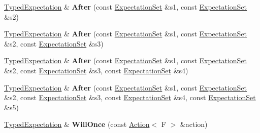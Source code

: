 \begin{DoxyCompactItemize}
\hyperlink{classtesting_1_1internal_1_1_typed_expectation}{Typed\+Expectation} \& {\bfseries After} (const \hyperlink{classtesting_1_1_expectation_set}{Expectation\+Set} \&s1, const \hyperlink{classtesting_1_1_expectation_set}{Expectation\+Set} \&s2)
\item 
\mbox{\label{classtesting_1_1internal_1_1_typed_expectation_a95a341dd221901b5e51dd7cfdbdb3570}} 
\hyperlink{classtesting_1_1internal_1_1_typed_expectation}{Typed\+Expectation} \& {\bfseries After} (const \hyperlink{classtesting_1_1_expectation_set}{Expectation\+Set} \&s1, const \hyperlink{classtesting_1_1_expectation_set}{Expectation\+Set} \&s2, const \hyperlink{classtesting_1_1_expectation_set}{Expectation\+Set} \&s3)
\item 
\mbox{\label{classtesting_1_1internal_1_1_typed_expectation_a1749e368f659352ed8375512acafc178}} 
\hyperlink{classtesting_1_1internal_1_1_typed_expectation}{Typed\+Expectation} \& {\bfseries After} (const \hyperlink{classtesting_1_1_expectation_set}{Expectation\+Set} \&s1, const \hyperlink{classtesting_1_1_expectation_set}{Expectation\+Set} \&s2, const \hyperlink{classtesting_1_1_expectation_set}{Expectation\+Set} \&s3, const \hyperlink{classtesting_1_1_expectation_set}{Expectation\+Set} \&s4)
\item 
\mbox{\label{classtesting_1_1internal_1_1_typed_expectation_a72c0105b147ee2995d183c8e4109f6ca}} 
\hyperlink{classtesting_1_1internal_1_1_typed_expectation}{Typed\+Expectation} \& {\bfseries After} (const \hyperlink{classtesting_1_1_expectation_set}{Expectation\+Set} \&s1, const \hyperlink{classtesting_1_1_expectation_set}{Expectation\+Set} \&s2, const \hyperlink{classtesting_1_1_expectation_set}{Expectation\+Set} \&s3, const \hyperlink{classtesting_1_1_expectation_set}{Expectation\+Set} \&s4, const \hyperlink{classtesting_1_1_expectation_set}{Expectation\+Set} \&s5)
\item 
\mbox{\label{classtesting_1_1internal_1_1_typed_expectation_a41b0d15e44e95d52f4d5c310fb9e9683}} 
\hyperlink{classtesting_1_1internal_1_1_typed_expectation}{Typed\+Expectation} \& {\bfseries Will\+Once} (const \hyperlink{classtesting_1_1_action}{Action}$<$ F $>$ \&action)
\item 

\end{DoxyCompactItemize}
